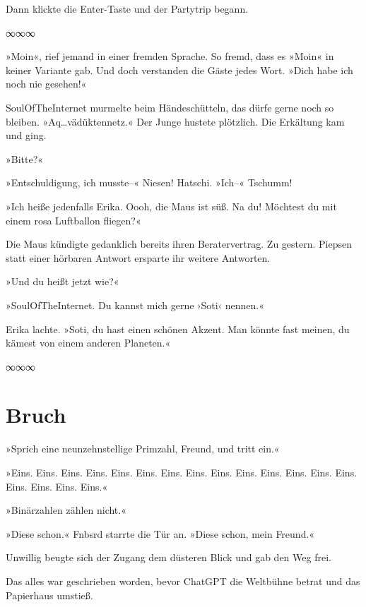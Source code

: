 Dann klickte die Enter-Taste und der Partytrip begann.

\begin{center}
∞∞∞
\end{center}

»Moin«, rief jemand in einer fremden Sprache. So fremd, dass es »Moin« in keiner Variante gab. Und doch verstanden die Gäste jedes Wort. »Dich habe ich noch nie gesehen!«

SoulOfTheInternet murmelte beim Händeschütteln, das dürfe gerne noch so bleiben. »Aq…vädüktennetz.« Der Junge hustete plötzlich. Die Erkältung kam und ging.

»Bitte?«

»Entschuldigung, ich musste–« Niesen! Hatschi. »Ich–«  Tschumm!

»Ich heiße jedenfalls Erika. Oooh, die Maus ist süß. Na du! Möchtest du mit einem rosa Luftballon fliegen?«

Die Maus kündigte gedanklich bereits ihren Beratervertrag. Zu gestern. Piepsen statt einer hörbaren Antwort ersparte ihr weitere Antworten.

»Und du heißt jetzt wie?«

»SoulOfTheInternet. Du kannst mich gerne ›Soti‹ nennen.«

Erika lachte. »Soti, du hast einen schönen Akzent. Man könnte fast meinen, du kämest von einem anderen Planeten.«

\begin{center}
∞∞∞
\end{center}

\chapter{Bruch}

»Sprich eine neunzehnstellige Primzahl, Freund, und tritt ein.«

»Eins. Eins. Eins. Eins. Eins. Eins. Eins. Eins. Eins. Eins. Eins. Eins. Eins. Eins. Eins. Eins. Eins. Eins.«

»Binärzahlen zählen nicht.«

»Diese schon.« Fnbsrd starrte die Tür an. »Diese schon, mein Freund.«

Unwillig beugte sich der Zugang dem düsteren Blick und gab den Weg frei.

\bigskip

Das alles war geschrieben worden, bevor ChatGPT die Weltbühne betrat und das Papierhaus umstieß.

